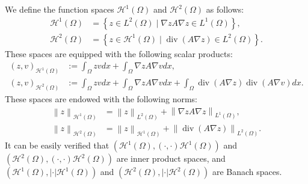 \documentclass[9pt,reqno]{amsart}
\theoremstyle{plain}
\numberwithin{equation}{section}
\numberwithin{theorem}{section}
\def\Om{\Omega}
\DeclareMathOperator*{\Div}{\mathrm{div}}
\def\Om{\Omega}
\begin{document}
	We define the function spaces $\mathcal{H}^1(\Omega)$ and $\mathcal{H}^2(\Omega)$ as follows: 
	\begin{equation}\label{space}
		\begin{split}
			\mathcal{H}^1(\Om)
			&=\left\lbrace z\in L^2(\Om) \mid \nabla z A \nabla z \in L^1(\Om) \right\rbrace,\\
			\mathcal{H}^2(\Om)
			&=\left\lbrace z\in \mathcal{H}^1(\Om) \mid \Div(A\nabla z) \in L^2(\Om) \right\rbrace.
		\end{split}
	\end{equation}
	These spaces are equipped with the following scalar products:
	\begin{equation}\label{inner}
		\begin{split}
			(z,v)_{\mathcal{H}^1(\Om)}
			&:=\int_{\Omega} zv  dx  + \int_{\Omega} \nabla z A \nabla v dx,\\
			(z,v)_{\mathcal{H}^2(\Om)}
			&:=\int_{\Omega} zv  dx  + \int_{\Omega} \nabla z A \nabla v dx + \int_{\Omega} \Div(A\nabla z)\Div(A\nabla v) dx.
		\end{split}
	\end{equation}
	These spaces are endowed with the following norms:
	\begin{equation}\label{norm}
		\begin{split}
			\left\| z \right\|_{\mathcal{H}^1(\Om)} 
			&= \left\| z \right\|_{L^2(\Om)} + \left\| \nabla z A \nabla z\right\|_{L^1(\Om)},\\
			\left\| z \right\|_{\mathcal{H}^2(\Om)} 
			&= \left\| z \right\|_{\mathcal{H}^1(\Om)} + \left\| \Div(A\nabla z)\right\|_{L^2(\Om)}.
		\end{split}
	\end{equation}
	It can be easily verified that $(\mathcal{H}^1(\Omega), (\cdot,\cdot){\mathcal{H}^1(\Omega)})$ and $(\mathcal{H}^2(\Omega), (\cdot,\cdot){\mathcal{H}^2(\Omega)})$ are inner product spaces, and $(\mathcal{H}^1(\Omega), |\cdot|{\mathcal{H}^1(\Omega)})$ and $(\mathcal{H}^2(\Omega), |\cdot|{\mathcal{H}^2(\Omega)})$ are Banach spaces.
	
\end{document}
